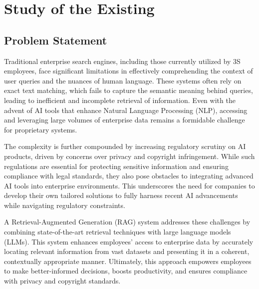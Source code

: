 \section{Study of the Existing}
\subsection{Problem Statement}
Traditional enterprise search engines, including those currently utilized by 3S employees, face significant limitations in effectively comprehending the context of user queries and the nuances of human language. These systems often rely on exact text matching, which fails to capture the semantic meaning behind queries, leading to inefficient and incomplete retrieval of information. Even with the advent of AI tools that enhance Natural Language Processing (NLP), accessing and leveraging large volumes of enterprise data remains a formidable challenge for proprietary systems.

The complexity is further compounded by increasing regulatory scrutiny on AI products, driven by concerns over privacy and copyright infringement. While such regulations are essential for protecting sensitive information and ensuring compliance with legal standards, they also pose obstacles to integrating advanced AI tools into enterprise environments. This underscores the need for companies to develop their own tailored solutions to fully harness recent AI advancements while navigating regulatory constraints.

A Retrieval-Augmented Generation (RAG) system addresses these challenges by combining state-of-the-art retrieval techniques with large language models (LLMs). This system enhances employees' access to enterprise data by accurately locating relevant information from vast datasets and presenting it in a coherent, contextually appropriate manner. Ultimately, this approach empowers employees to make better-informed decisions, boosts productivity, and ensures compliance with privacy and copyright standards.
